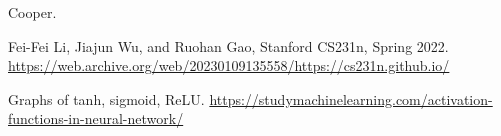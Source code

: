 \documentclass[11pt]{article}
\numberwithin{equation}{section}
\theoremstyle{definition}%
\begin{document}




\begin{thebibliography}{2}
     Cooper.

     Fei-Fei Li, Jiajun Wu, and Ruohan Gao, Stanford CS231n, Spring 2022. \url{https://web.archive.org/web/20230109135558/https://cs231n.github.io/}

     Graphs of tanh, sigmoid, ReLU. \url{https://studymachinelearning.com/activation-functions-in-neural-network/}

\end{thebibliography}
\end{document}
